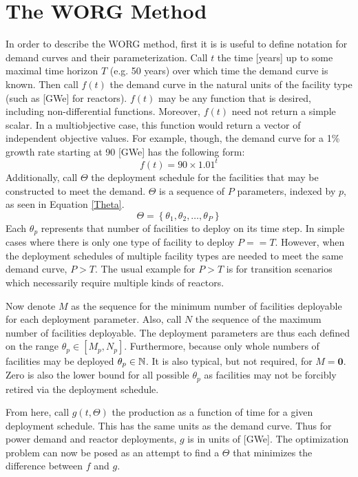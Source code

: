\section{The WORG Method}
\label{method}

In order to describe the WORG method, first it is is useful to define
notation for demand curves and their parameterization.  Call $t$ the time
[years] up to some maximal time horizon $T$ (e.g. 50 years) over which time
the demand curve is known.  Then call $f(t)$ the demand curve in the natural
units of the facility type (such as [GWe] for reactors).
$f(t)$ may be any function that is desired, including non-differential
functions. Moreover, $f(t)$ need not return a simple scalar.  In a
multiobjective case, this function would return a vector of independent
objective values.
For example, though, the demand curve for a 1\% growth rate
starting at 90 [GWe] has the following form:
\begin{equation}
\label{f-1}
f(t) = 90\times 1.01^t
\end{equation}
Additionally, call $\Theta$ the deployment schedule for the facilities that
may be constructed to meet the demand.
$\Theta$ is a sequence of $P$ parameters, indexed by $p$, as seen in
Equation \ref{Theta}.
\begin{equation}
\label{Theta}
\Theta = \left\{\theta_1, \theta_2, \ldots, \theta_P\right\}
\end{equation}
Each $\theta_p$ represents that number of facilities to deploy on its
time step. In simple cases where there is only one type of facility
to deploy $P == T$.  However, when the deployment schedules of multiple
facility types are needed to meet the same demand curve, $P > T$.  The usual
example for $P > T$ is for transition scenarios which necessarily require
multiple kinds of reactors.

Now denote $M$ as the sequence for the minimum number of facilities deployable
for each deployment parameter. Also, call $N$ the sequence of the maximum number
of facilities deployable. The deployment parameters are thus each defined
on the range $\theta_p \in [M_p, N_p]$. Furthermore, because only whole
numbers of facilities may be deployed $\theta_p \in \mathbb{N}$.  It is also typical,
but not required, for $M = \mathbf{0}$. Zero is also the lower bound
for all possible $\theta_p$ as facilities may not be forcibly retired via the
deployment schedule.

From here, call $g(t, \Theta)$ the production as a function of time for a
given deployment schedule. This has the same units as the demand curve.
Thus for power demand and reactor deployments, $g$ is in units of [GWe]. The
optimization problem can now be posed as an attempt to find a $\Theta$
that minimizes the difference between $f$ and $g$.




